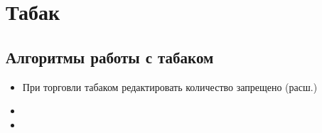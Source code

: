 \section{Табак}
\subsection{Алгоритмы работы с табаком}


\begin{itemize}
	\item При торговли табаком редактировать количество запрещено
		(расш.)
	\item 
	\item 
\end{itemize}


